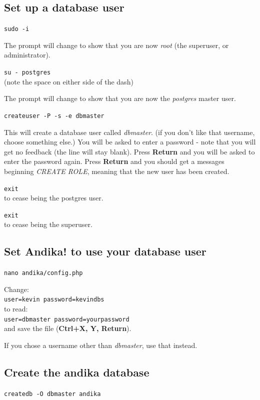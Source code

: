 \subsection{Set up a database user}
\label{ss:dbuser}

\verb|sudo -i|

The prompt will change to show that you are now \textit{root} (the superuser, or administrator).

\verb|su - postgres|\\
(note the space on either side of the dash)

The prompt will change to show that you are now the \textit{postgres} master user.

\verb|createuser -P -s -e dbmaster|

This will create a database user called \textit{dbmaster}.  (if you don't like that username, choose something else.) You will be asked to enter a password - note that you will get no feedback (the line will stay blank).  Press \textbf{Return} and you will be asked to enter the password again.  Press \textbf{Return} and you should get a messages beginning \textit{CREATE ROLE}, meaning that the new user has been created.

\verb|exit|\\
to cease being the postgres user.

\verb|exit|\\
to cease being the superuser.


\subsection{Set Andika! to use your database user}

\verb|nano andika/config.php|

Change:\\
\verb|user=kevin password=kevindbs|\\
to read:\\
\verb|user=dbmaster password=yourpassword|\\
and save the file (\textbf{Ctrl+X, Y, Return}).

If you chose a username other than \textit{dbmaster}, use that instead.


\subsection{Create the andika database}

\verb|createdb -O dbmaster andika|

